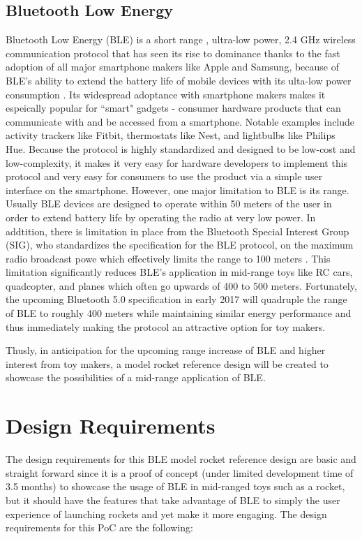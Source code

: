 \documentclass{workreport}
\begin{document}
\begin{body}
\subsection{Bluetooth Low Energy}
	Bluetooth Low Energy (BLE) is a short range , ultra-low power, 2.4 GHz wireless communication protocol that has seen its rise to dominance thanks to the fast adoption of all major smartphone makers like Apple and Samsung, because of BLE's ability to extend the battery life of mobile devices with its ulta-low power consumption \cite{k_townsend_ble}. Its widespread adoptance with smartphone makers makes it espeically popular for ``smart" gadgets - consumer hardware products that can communicate with and be accessed from a smartphone. Notable examples include activity trackers like Fitbit, thermostats like Nest, and lightbulbs like Philips Hue. Because the protocol is highly standardized and designed to be low-cost and low-complexity, it makes it very easy for hardware developers to implement this protocol and very easy for consumers to use the product via a simple user interface on the smartphone. However, one major limitation to BLE is its range. Usually BLE devices are designed to operate within 50 meters of the user in order to extend battery life by operating the radio at very low power. In addtition, there is limitation in place from the Bluetooth Special Interest Group (SIG), who standardizes the specification for the BLE protocol, on the maximum radio broadcast powe which effectively limits the range to 100 meters \cite{k_townsend_ble}. This limitation significantly reduces BLE's application in mid-range toys like RC cars, quadcopter, and planes which often go upwards of 400 to 500 meters. Fortunately, the upcoming Bluetooth 5.0 specification in early 2017 will quadruple the range of BLE to roughly 400 meters while maintaining similar energy performance and thus immediately making the protocol an attractive option for toy makers.

	Thusly, in anticipation for the upcoming range increase of BLE and higher interest from toy makers, a model rocket reference design will be created to showcase the possibilities of a mid-range application of BLE.

\section{Design Requirements}

	The design requirements for this BLE model rocket reference design are basic and straight forward since it is a proof of concept (under limited development time of 3.5 months) to showcase the usage of BLE in mid-ranged toys such as a rocket, but it should have the features that take advantage of BLE to simply the user experience of launching rockets and yet make it more engaging. The design requirements for this PoC are the following:


\end{body}
\end{document}
